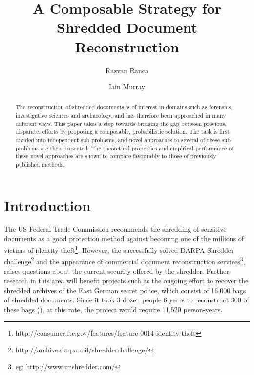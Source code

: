 \documentclass{llncs}
\begin{document}
\title{A Composable Strategy for Shredded Document Reconstruction}

\author{Razvan Ranca \and Iain Murray}


\maketitle              %

\begin{abstract}
The reconstruction of shredded documents is of interest in domains such as forensics, investigative sciences and  archaeology, and has therefore been approached in many different ways. This paper takes a step towards bridging the gap between previous, disparate, efforts by proposing a composable, probabilistic solution. The task is first divided into independent sub-problems, and novel approaches to several of these sub-problems are then presented. The theoretical properties and empirical performance of these novel approaches are shown to compare favourably to those of previously published methods.
\end{abstract}

\section{Introduction}

The US Federal Trade Commission recommends the shredding of sensitive documents as a good protection method against becoming one of the millions of victims of identity theft\footnote{http://consumer.ftc.gov/features/feature-0014-identity-theft}. However, the successfully solved DARPA Shredder challenge\footnote{http://archive.darpa.mil/shredderchallenge/} and the appearance of commercial document reconstruction services\footnote{eg: http://www.unshredder.com/}, raises questions about the current security offered by the shredder. Further research in this area will benefit projects such as the ongoing effort to recover the shredded archives of the East German secret police, which consist of 16,000 bags of shredded documents. Since it took 3 dozen people 6 years to reconstruct 300 of these bags (\cite{P6}), at this rate, the project would require 11,520 person-years.
\end{document}
